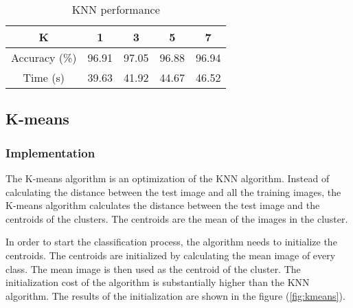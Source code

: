 \renewcommand{\arraystretch}{1.5}

\begin{center}
\begin{table}[h]
    \centering
    \begin{tabular}{|c|c|c|c|c|}
        \hline
        K & 1 & 3 & 5 & 7 \\
        \hline
        Accuracy (\%) & 96.91 & 97.05 & 96.88 & 96.94 \\
        \hline
        Time (s) & 39.63 & 41.92 & 44.67 & 46.52 \\
        \hline
    \end{tabular}
    \caption{KNN performance}
    \label{tab:knn}
\end{table}
\end{center}
\renewcommand{\arraystretch}{1}

\subsection{K-means}
\subsubsection{Implementation}

The K-means algorithm is an optimization of the KNN algorithm. Instead of calculating the distance between the test image and all the
training images, the K-means algorithm calculates the distance between the test image and the centroids of the clusters. The centroids
are the mean of the images in the cluster.

In order to start the classification process, the algorithm needs to initialize the centroids. The centroids are initialized by calculating
the mean image of every class. The mean image is then used as the centroid of the cluster. The initialization cost of the algorithm is substantially
higher than the KNN algorithm. The results of the initialization are shown in the figure (\ref{fig:kmeans}).

